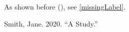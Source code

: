 As shown before (), see \ref{missingLabel}.

\label{refs}
\begin{CSLReferences}{1}{0}
Smith, Jane. 2020. {``A Study.''}

\end{CSLReferences}
